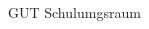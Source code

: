 \documentclass[a4paper]{article}
\begin{document}
\printGenericVSLHeader
\begin{center}
\begin{vsltext}{3cm}{4cm}

   \vspace{0.5cm} 


    \vspace{1.5cm}

    GUT Schulumgsraum 

\end{vsltext}

\end{center}
\end{document}
